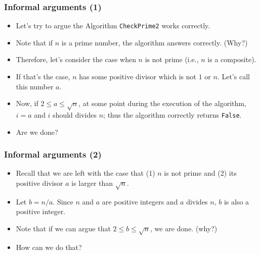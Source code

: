 \documentclass{beamer}
\begin{document}
\begin{frame}\frametitle{Informal arguments (1)}
  \begin{itemize}
  \item Let's try to argue the Algorithm {\tt CheckPrime2} works
    correctly.  \pause

  \item
    Note that if $n$ is a prime number, the algorithm answers
    correctly. (Why?)  \pause

  \item Therefore, let's consider the case when $n$ is not prime
    (i.e., $n$ is a composite).  \pause

  \item If that's the case, $n$ has some positive divisor which is not
    $1$ or $n$.  Let's call this number $a$.  \pause

  \item Now, if $2\leq a\leq\sqrt{n}$, at some point during the
    execution of the algorithm, $i=a$ and $i$ should divides $n$; thus
    the algorithm correctly returns {\tt False}.  \pause

  \item
    Are we done?
  \end{itemize}
  
\end{frame}

\begin{frame}\frametitle{Informal arguments (2)}
  \begin{itemize}
  \item Recall that we are left with the case that (1) $n$ is not
    prime and (2) its positive divisor $a$ is larger than
    $\sqrt{n}$. \pause

  \item
    Let $b=n/a$.  Since $n$ and $a$ are positive integers and $a$
    divides $n$, $b$ is also a positive integer.
    \pause

  \item
    Note that if we can argue that $2\leq b\leq\sqrt{n}$, we are done.
    (why?)
    \pause

  \item
    How can we do that?
  \end{itemize}
  
\end{frame}
\end{document}
